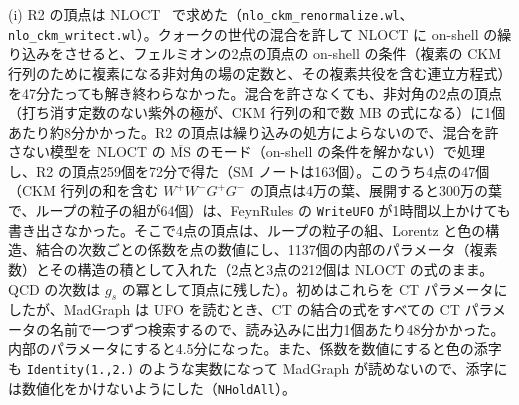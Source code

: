 \documentclass[a4paper,10pt]{ltjsarticle}
\newcommand{\MSbar}{\overline{\mathrm{MS}}}
\begin{document}
(i) R2 の頂点は NLOCT~\cite{nloct} で求めた（\texttt{nlo\_ckm\_renormalize.wl}、\texttt{nlo\_ckm\_writect.wl}）。クォークの世代の混合を許して NLOCT に on-shell の繰り込みをさせると、フェルミオンの2点の頂点の on-shell の条件（複素の CKM 行列のために複素になる非対角の場の定数と、その複素共役を含む連立方程式）を47分たっても解き終わらなかった。混合を許さなくても、非対角の2点の頂点（打ち消す定数のない紫外の極が、CKM 行列の和で数 MB の式になる）に1個あたり約8分かかった。R2 の頂点は繰り込みの処方によらないので、混合を許さない模型を NLOCT の $\MSbar$ のモード（on-shell の条件を解かない）で処理し、R2 の頂点259個を72分で得た（SM ノートは163個）。このうち4点の47個（CKM 行列の和を含む $W^+W^-G^+G^-$ の頂点は4万の葉、展開すると300万の葉で、ループの粒子の組が64個）は、FeynRules の \texttt{WriteUFO} が1時間以上かけても書き出さなかった。そこで4点の頂点は、ループの粒子の組、Lorentz と色の構造、結合の次数ごとの係数を点の数値にし、1137個の内部のパラメータ（複素数）とその構造の積として入れた（2点と3点の212個は NLOCT の式のまま。QCD の次数は $g_s$ の冪として頂点に残した）。初めはこれらを CT パラメータにしたが、MadGraph は UFO を読むとき、CT の結合の式をすべての CT パラメータの名前で一つずつ検索するので、読み込みに出力1個あたり48分かかった。内部のパラメータにすると4.5分になった。また、係数を数値にすると色の添字も \texttt{Identity(1.,2.)} のような実数になって MadGraph が読めないので、添字には数値化をかけないようにした（\texttt{NHoldAll}）。
\end{document}
